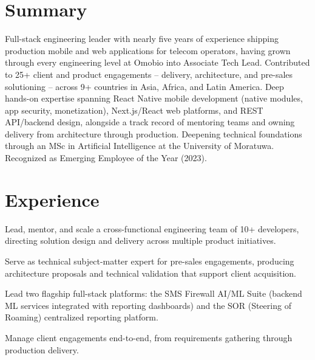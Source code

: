 \documentclass[10.5pt]{article}
\begin{document}

\section*{Summary}
Full-stack engineering leader with nearly five years of experience shipping production mobile and web applications for telecom operators, having grown through every engineering level at Omobio into Associate Tech Lead. Contributed to 25+ client and product engagements -- delivery, architecture, and pre-sales solutioning -- across 9+ countries in Asia, Africa, and Latin America. Deep hands-on expertise spanning React Native mobile development (native modules, app security, monetization), Next.js/React web platforms, and REST API/backend design, alongside a track record of mentoring teams and owning delivery from architecture through production. Deepening technical foundations through an MSc in Artificial Intelligence at the University of Moratuwa. Recognized as Emerging Employee of the Year (2023).

\section*{Experience}

\begin{cvitems}
  \item Lead, mentor, and scale a cross-functional engineering team of 10+ developers, directing solution design and delivery across multiple product initiatives.
  \item Serve as technical subject-matter expert for pre-sales engagements, producing architecture proposals and technical validation that support client acquisition.
  \item Lead two flagship full-stack platforms: the SMS Firewall AI/ML Suite (backend ML services integrated with reporting dashboards) and the SOR (Steering of Roaming) centralized reporting platform.
  \item Manage client engagements end-to-end, from requirements gathering through production delivery.
\end{cvitems}
\end{document}
